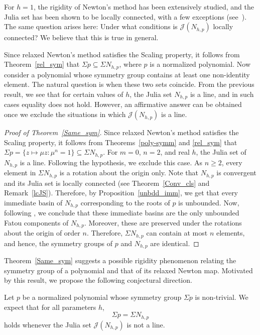 \documentclass[12pt]{article}
\numberwithin{equation}{section}
\begin{document}
For $h=1$, the rigidity of Newton's method has been extensively studied, and the Julia set has been shown to be locally connected, with a few exceptions (see~\cite{DS2022}). The same question arises here: Under what conditions is $\mathcal{J}(N_{h,p})$ locally connected? We believe that this is true in general.

Since relaxed Newton's method satisfies the Scaling property, it follows from Theorem~\ref{rel_sym} that $\Sigma p\subseteq\Sigma N_{h,p}$, where $p$ is a normalized polynomial. Now consider a polynomial whose symmetry group contains at least one non-identity element. The natural question is when these two sets coincide. From the previous result, we see that for certain values of $h$, the Julia set $N_{h,p}$ is a line, and in such cases equality does not hold. However, an affirmative answer can be obtained once we exclude the situations in which $\mathcal{J}(N_{h,p})$ is a line.
\begin{proof}[Proof of Theorem~\ref{Same_sym}]
	Since relaxed Newton's method satisfies the Scaling property, it follows from Theorems~\ref{poly-symm} and \ref{rel_sym} that $\Sigma p=\{z\mapsto \mu z: \mu^n=1\}\subseteq\Sigma N_{h,p}$. For $m=0$, $n=2$, and real $h$, the Julia set of $N_{h,p}$ is a line. Following the hypothesis, we exclude this case. As $n\geq 2$, every element in $\Sigma N_{h,p}$ is a rotation about the origin only. Note that $N_{h,p}$ is convergent and its Julia set is locally connected (see Theorem~\ref{Conv_cls} and Remark~\ref{lcJS}). Therefore, by Proposition~\ref{unbdd_imm}, we get that every immediate basin of $N_{h,p}$ corresponding to the roots of $p$ is unbounded. Now, following \cite[Lemma 3.3]{Sym_dyn}, we conclude that these immediate basins are the only unbounded Fatou components of $N_{h,p}$.  Moreover, these are preserved under the rotations about the origin of order $n$. Therefore, $\Sigma N_{h,p}$ can contain at most $n$ elements, and hence, the symmetry groups of $p$ and $N_{h,p}$ are identical.
\end{proof}
Theorem~\ref{Same_sym} suggests a possible rigidity phenomenon relating the symmetry group of a polynomial and that of its relaxed Newton map. Motivated by this result, we propose the following conjectural direction.

Let $p$ be a normalized polynomial whose symmetry group $\Sigma p$ is non-trivial. We expect that for all parameters $h$,
$$
\Sigma p=\Sigma N_{h,p}
$$
holds whenever the Julia set $\mathcal{J}(N_{h,p})$ is not a line.
\end{document}
